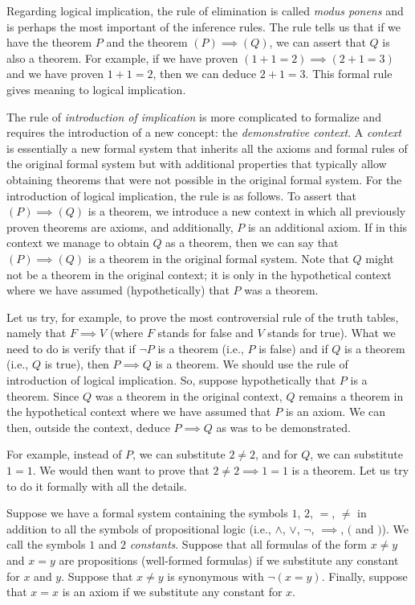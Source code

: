 Regarding logical implication, the rule of elimination is called \emph{modus
ponens} and is perhaps the most important of the inference rules.
%
%
The rule tells us that if we have the theorem $P$ and the theorem $(P)\implies
(Q)$, we can assert that $Q$ is also a theorem. For example, if we have proven
$(1+1=2) \implies (2+1=3)$ and we have proven $1+1=2$, then we can deduce
$2+1=3$. This formal rule gives meaning to logical implication.

The rule of \emph{introduction of implication} is more complicated to formalize
and requires the introduction of a new concept: the \emph{demonstrative
context}.
%
%
A \emph{context} is essentially a new formal system that inherits all the axioms
and formal rules of the original formal system but with additional properties
that typically allow obtaining theorems that were not possible in the original
formal system. For the introduction of logical implication, the rule is as
follows. To assert that $(P)\implies (Q)$ is a theorem, we introduce a new
context in which all previously proven theorems are axioms, and additionally,
$P$ is an additional axiom. If in this context we manage to obtain $Q$ as a
theorem, then we can say that $(P)\implies (Q)$ is a theorem in the original
formal system. Note that $Q$ might not be a theorem in the original context; it
is only in the hypothetical context where we have assumed (hypothetically) that
$P$ was a theorem.

Let us try, for example, to prove the most controversial rule of the truth
tables, namely that $F\implies V$ (where $F$ stands for false and $V$ stands for
true). What we need to do is verify that if $\lnot P$ is a theorem (i.e., $P$ is
false) and if $Q$ is a theorem (i.e., $Q$ is true), then $P\implies Q$ is a
theorem. We should use the rule of introduction of logical implication. So,
suppose hypothetically that $P$ is a theorem. Since $Q$ was a theorem in the
original context, $Q$ remains a theorem in the hypothetical context where we
have assumed that $P$ is an axiom. We can then, outside the context, deduce
$P\implies Q$ as was to be demonstrated.

For example, instead of $P$, we can substitute $2\neq 2$, and for $Q$, we can
substitute $1=1$. We would then want to prove that $2\neq 2 \implies 1=1$ is a
theorem. Let us try to do it formally with all the details.

Suppose we have a formal system containing the symbols $1$, $2$, $=$, $\neq$ in
addition to all the symbols of propositional logic (i.e., $\land$, $\lor$,
$\lnot$, $\implies$, $($ and $)$). We call the symbols $1$ and $2$
\emph{constants}. Suppose that all formulas of the form $x\neq y$ and $x=y$ are
propositions (well-formed formulas) if we substitute any constant for $x$ and
$y$. Suppose that $x\neq y$ is synonymous with $\lnot (x=y)$. Finally, suppose
that $x=x$ is an axiom if we substitute any constant for $x$.

